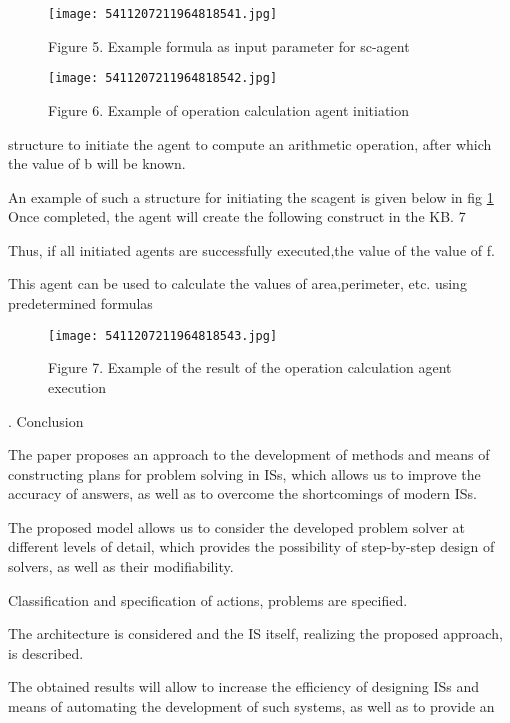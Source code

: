 \documentclass[10pt,a4paper,twocolumn]{article}
\newcommand{\RomanNumeralCaps}[1]
{\MakeUppercase{\romannumeral #1}}
\begin{document}
 \vspace{1.5cm}
 \begin{figure}
    \centering
    \texttt{[image: 5411207211964818541.jpg]}
    \caption{Figure 5. Example formula as input parameter for sc-agent}
\end{figure}
\begin{figure}[h]
    \centering
    \texttt{[image: 5411207211964818542.jpg]}
    \caption{Figure 6. Example of operation calculation agent initiation}
    \label{fig:table}
\end{figure}
structure to initiate the agent to compute an arithmetic operation, after which the value of b will be known.
\par  An example of such a structure for initiating the scagent is given below in fig \ref{fig:table}
\\  Once completed, the agent will create the following
construct in the KB. 7
\par  Thus, if all initiated agents are successfully executed,the value of the value of f.
\par  This agent can be used to calculate the values of area,perimeter, etc. using predetermined formulas
\begin{figure}[h]
    \centering
    \texttt{[image: 5411207211964818543.jpg]}
    \caption{Figure 7. Example of the result of the operation calculation agent execution}
\end{figure}
\newpage
\hspace{2.5cm} \RomanNumeralCaps{4}. Conclusion
\par The paper proposes an approach to the development
of methods and means of constructing plans for problem
solving in ISs, which allows us to improve the accuracy
of answers, as well as to overcome the shortcomings of
modern ISs.
\par The proposed model allows us to consider the developed problem solver at different levels of detail, which
provides the possibility of step-by-step design of solvers,
as well as their modifiability.
\par Classification and specification of actions, problems
are specified.
\par The architecture is considered and the IS itself, realizing the proposed approach, is described.
\par The obtained results will allow to increase the efficiency of designing ISs and means of automating the
development of such systems, as well as to provide an
\end{document}

